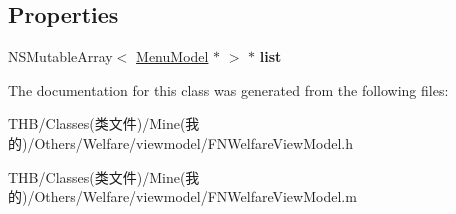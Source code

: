 \subsection*{Properties}
\begin{DoxyCompactItemize}
\item 
\mbox{\label{interface_f_n_welfare_view_model_a1c6e4a24afe79ef809b183e89d65b173}} 
N\+S\+Mutable\+Array$<$ \mbox{\hyperlink{interface_menu_model}{Menu\+Model}} $\ast$ $>$ $\ast$ {\bfseries list}
\end{DoxyCompactItemize}


The documentation for this class was generated from the following files\+:\begin{DoxyCompactItemize}
\item 
T\+H\+B/\+Classes(类文件)/\+Mine(我的)/\+Others/\+Welfare/viewmodel/F\+N\+Welfare\+View\+Model.\+h\item 
T\+H\+B/\+Classes(类文件)/\+Mine(我的)/\+Others/\+Welfare/viewmodel/F\+N\+Welfare\+View\+Model.\+m\end{DoxyCompactItemize}
